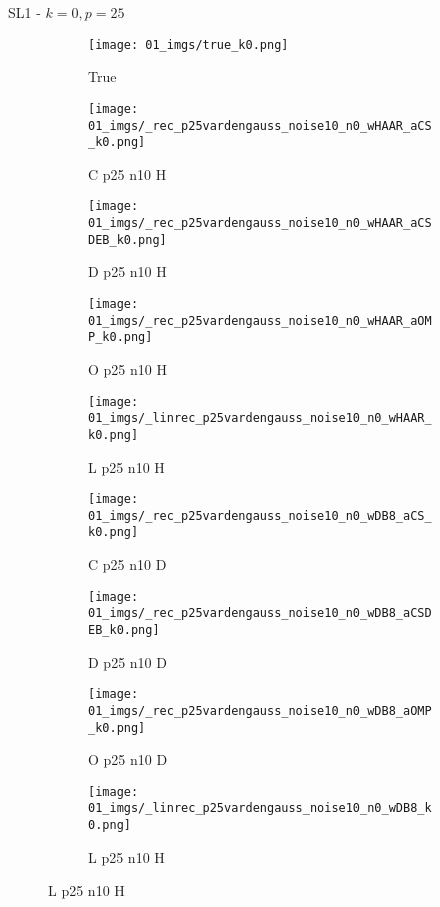 \begin{frame}{SL1 - $k=0,p=25$}{}
\begin{figure}
\begin{subfigure}{0.1\textwidth}
\texttt{[image: 01\_imgs/true\_k0.png]}
\caption*{\Tiny True}
\end{subfigure}
\begin{subfigure}{0.1\textwidth}
\texttt{[image: 01\_imgs/\_rec\_p25vardengauss\_noise10\_n0\_wHAAR\_aCS\_k0.png]}
\caption*{\Tiny C p25 n10 H}
\end{subfigure}
\begin{subfigure}{0.1\textwidth}
\texttt{[image: 01\_imgs/\_rec\_p25vardengauss\_noise10\_n0\_wHAAR\_aCSDEB\_k0.png]}
\caption*{\Tiny D p25 n10 H}
\end{subfigure}
\begin{subfigure}{0.1\textwidth}
\texttt{[image: 01\_imgs/\_rec\_p25vardengauss\_noise10\_n0\_wHAAR\_aOMP\_k0.png]}
\caption*{\Tiny O p25 n10 H}
\end{subfigure}
\begin{subfigure}{0.1\textwidth}
\texttt{[image: 01\_imgs/\_linrec\_p25vardengauss\_noise10\_n0\_wHAAR\_k0.png]}
\caption*{\Tiny L p25 n10 H}
\end{subfigure}
\begin{subfigure}{0.1\textwidth}
\texttt{[image: 01\_imgs/\_rec\_p25vardengauss\_noise10\_n0\_wDB8\_aCS\_k0.png]}
\caption*{\Tiny C p25 n10 D}
\end{subfigure}
\begin{subfigure}{0.1\textwidth}
\texttt{[image: 01\_imgs/\_rec\_p25vardengauss\_noise10\_n0\_wDB8\_aCSDEB\_k0.png]}
\caption*{\Tiny D p25 n10 D}
\end{subfigure}
\begin{subfigure}{0.1\textwidth}
\texttt{[image: 01\_imgs/\_rec\_p25vardengauss\_noise10\_n0\_wDB8\_aOMP\_k0.png]}
\caption*{\Tiny O p25 n10 D}
\end{subfigure}
\begin{subfigure}{0.1\textwidth}
\texttt{[image: 01\_imgs/\_linrec\_p25vardengauss\_noise10\_n0\_wDB8\_k0.png]}
\caption*{\Tiny L p25 n10 H}
\end{subfigure}

\vspace{5pt}


\end{figure}
\end{frame}
